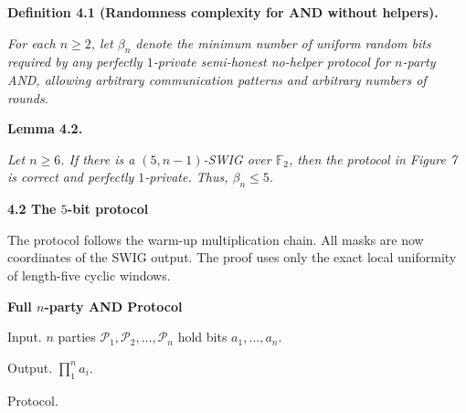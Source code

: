 

\par\medskip\noindent\textbf{
\textbf{Definition 4.1}\textbf{ }(Randomness complexity for AND without helpers)\textbf{.}
}\par



\emph{For each $n\geq 2$, let $\beta_{n}$ denote the minimum number of uniform random bits required by any perfectly $1$-private semi-honest no-helper protocol for $n$-party AND, allowing arbitrary communication patterns and arbitrary numbers of rounds.}\par







\par\medskip\noindent\textbf{
\textbf{Lemma 4.2}\textbf{.}
}\par



\emph{Let $n\geq 6$. If there is a $(5,n-1)$-SWIG over $\mathbb{F}_{2}$, then the protocol in Figure 7 is correct and perfectly $1$-private. Thus, $\beta_{n}\leq 5$.}\par







\par\medskip\noindent\textbf{
4.2 The $5$-bit protocol}\par




The protocol follows the warm-up multiplication chain. All masks are now coordinates of the SWIG output. The proof uses only the exact local uniformity of length-five cyclic windows.\par





{\bfseries Full $n$-party AND Protocol


Input.
$n$ parties $\mathcal{P}_{1},\mathcal{P}_{2},\dots,\mathcal{P}_{n}$ hold bits $a_{1},\dots,a_{n}$. 


Output. $\prod_{1}^{n}a_{i}$.


Protocol.}\par



